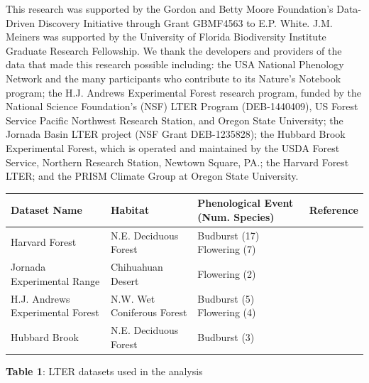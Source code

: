 \documentclass[fleqn,12pt,lineno]{article}
\begin{document}
This research was supported by the Gordon and Betty Moore Foundation’s Data-Driven Discovery Initiative through Grant GBMF4563 to E.P. White. J.M. Meiners was supported by the University of Florida Biodiversity Institute Graduate Research Fellowship. We thank the developers and providers of the data that made this research possible including: the USA National Phenology Network and the many participants who contribute to its Nature’s Notebook program; the H.J. Andrews Experimental Forest research program, funded by the National Science Foundation's (NSF) LTER Program (DEB-1440409), US Forest Service Pacific Northwest Research Station, and Oregon State University; the Jornada Basin LTER project (NSF Grant DEB-1235828); the Hubbard Brook Experimental Forest, which is operated and maintained by the USDA Forest Service, Northern Research Station, Newtown Square, PA.; the Harvard Forest LTER; and the PRISM Climate Group at Oregon State University.








\newpage

\begin{adjustbox}{angle=90}
    \begin{tabular}{ | l | l | l | l |}
    \hline
    Dataset Name & Habitat &  Phenological Event (Num. Species) & Reference \\ \hline
    Harvard Forest & N.E. Deciduous Forest & Budburst (17) Flowering (7) & \citep{okeefe2015} \\
    Jornada Experimental Range & Chihuahuan Desert & Flowering (2) &  \\
    H.J. Andrews Experimental Forest & N.W. Wet Coniferous Forest & Budburst (5) Flowering (4) & \citep{schulze2017} \\
    Hubbard Brook & N.E. Deciduous Forest & Budburst (3) & \citep{bailey2018} \\
    \hline
    \end{tabular}
\end{adjustbox} \newline
\textbf{Table 1}: LTER datasets used in the analysis




\end{document}
